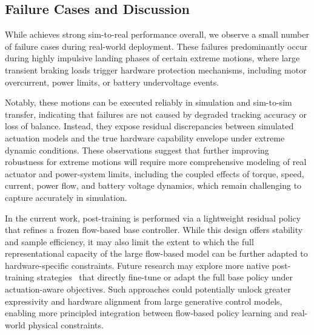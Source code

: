 \subsection{Failure Cases and Discussion}
\label{sec:supp_failure}

While \model achieves strong sim-to-real performance overall, we observe a small
number of failure cases during real-world deployment.
These failures predominantly occur during highly impulsive landing phases of
certain extreme motions, where large transient braking loads trigger hardware
protection mechanisms, including motor overcurrent, power limits, or battery
undervoltage events.

Notably, these motions can be executed reliably in simulation and sim-to-sim
transfer, indicating that failures are not caused by degraded tracking accuracy
or loss of balance.
Instead, they expose residual discrepancies between simulated actuation models
and the true hardware capability envelope under extreme dynamic conditions. These observations suggest that further improving robustness for extreme motions
will require more comprehensive modeling of real actuator and power-system limits,
including the coupled effects of torque, speed, current, power flow, and battery
voltage dynamics, which remain challenging to capture accurately in simulation.

In the current work, post-training is performed via a lightweight residual policy that refines a frozen flow-based base controller. While this design offers stability and sample efficiency, it may also limit the extent to which the full representational capacity of the large flow-based model can be further adapted to hardware-specific constraints. Future research may explore more native post-training strategies~\cite{yi2026flow} that directly fine-tune or adapt the full base policy under actuation-aware objectives. Such approaches could potentially unlock greater expressivity and hardware alignment from large generative control models, enabling more principled integration between flow-based policy learning and real-world physical constraints.



